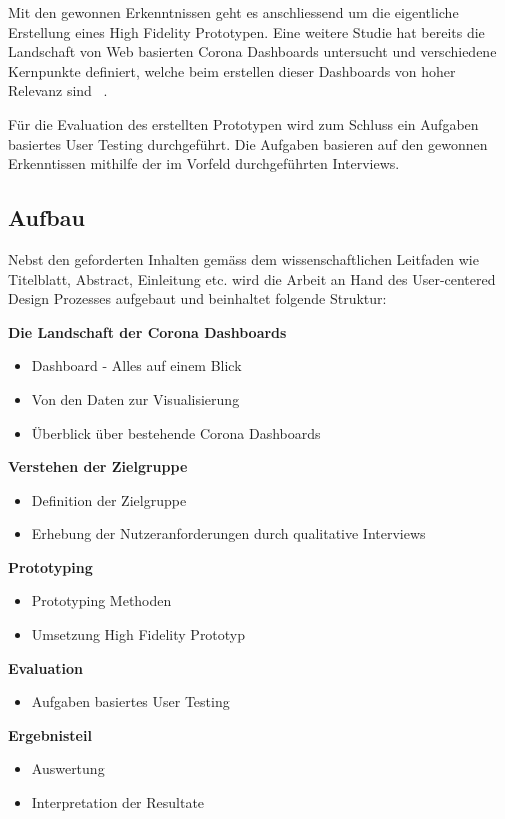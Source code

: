\documentclass[12pt, oneside]{article}
\begin{document}
Mit den gewonnen Erkenntnissen geht es anschliessend um die eigentliche Erstellung eines High Fidelity Prototypen. Eine weitere Studie hat bereits die Landschaft von Web basierten Corona Dashboards untersucht und verschiedene Kernpunkte definiert, welche beim erstellen dieser Dashboards von hoher Relevanz sind ~\citep{web_based_covid_dashboards}.

Für die Evaluation des erstellten Prototypen wird zum Schluss ein Aufgaben basiertes User Testing durchgeführt. Die Aufgaben basieren auf den gewonnen Erkenntissen mithilfe der im Vorfeld durchgeführten Interviews.

\clearpage
\subsection{Aufbau}
Nebst den geforderten Inhalten gemäss dem wissenschaftlichen Leitfaden wie Titelblatt, Abstract, Einleitung etc. wird die Arbeit an Hand des User-centered Design Prozesses aufgebaut und beinhaltet folgende Struktur:

\textbf{Die Landschaft der Corona Dashboards}
\begin{itemize}
	\item Dashboard - Alles auf einem Blick
	\item Von den Daten zur Visualisierung
	\item Überblick über bestehende Corona Dashboards
\end{itemize}

\textbf{Verstehen der Zielgruppe}
\begin{itemize}
	\item Definition der Zielgruppe
	\item Erhebung der Nutzeranforderungen durch qualitative Interviews
\end{itemize}

\textbf{Prototyping}
\begin{itemize}
	\item Prototyping Methoden
	\item Umsetzung High Fidelity Prototyp
\end{itemize}


\textbf{Evaluation}
\begin{itemize}
	\item Aufgaben basiertes User Testing
\end{itemize}


\textbf{Ergebnisteil}
\begin{itemize}
	\item Auswertung
	\item Interpretation der Resultate
\end{itemize}
\end{document}

